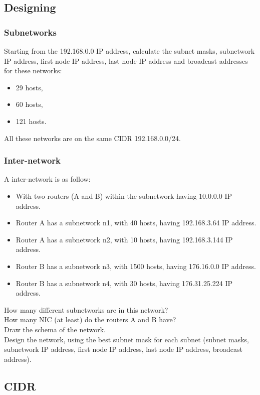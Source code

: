 \documentclass[11pt]{article}
\begin{document}
\subsection{Designing}
\subsubsection{Subnetworks}
Starting from the 192.168.0.0 IP address, calculate the subnet masks, subnetwork IP address, first node IP address, last node IP address and broadcast addresses for these networks:
\begin{itemize}
  \item 29 hosts,
  \item 60 hosts,
  \item 121 hosts.
\end{itemize}
All these networks are on the same CIDR 192.168.0.0/24.

\subsubsection{Inter-network}
A inter-network is as follow:
\begin{itemize}
  \item With two routers (A and B) within the subnetwork having 10.0.0.0      IP address.
  \item Router A has a subnetwork n1, with 40 hosts,     having 192.168.3.64  IP address.
  \item Router A has a subnetwork n2, with 10 hosts,     having 192.168.3.144 IP address.
  \item Router B has a subnetwork n3, with 1500 hosts,   having 176.16.0.0    IP address.
  \item Router B has a subnetwork n4, with 30 hosts,     having 176.31.25.224 IP address.
\end{itemize}
How many different subnetworks are in this network?\\
How many NIC (at least) do the routers A and B have?\\
Draw the schema of the network.\\
Design the network, using the best subnet mask for each subnet (subnet masks, subnetwork IP address, first node IP address, last node IP address, broadcast address).

\subsection{CIDR}
\end{document}
